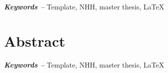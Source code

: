 \documentclass[../Main.tex]{subfiles}
\begin{document}


\par\vspace*{\fill} %
\textbf{\textit{Keywords --}} Template, NHH, master thesis, LaTeX %

\newpage
{} %
\section*{Abstract}



\par\vspace*{\fill} %
\textbf{\textit{Keywords --}} Template, NHH, master thesis, LaTeX %

\biblio %
\end{document}
